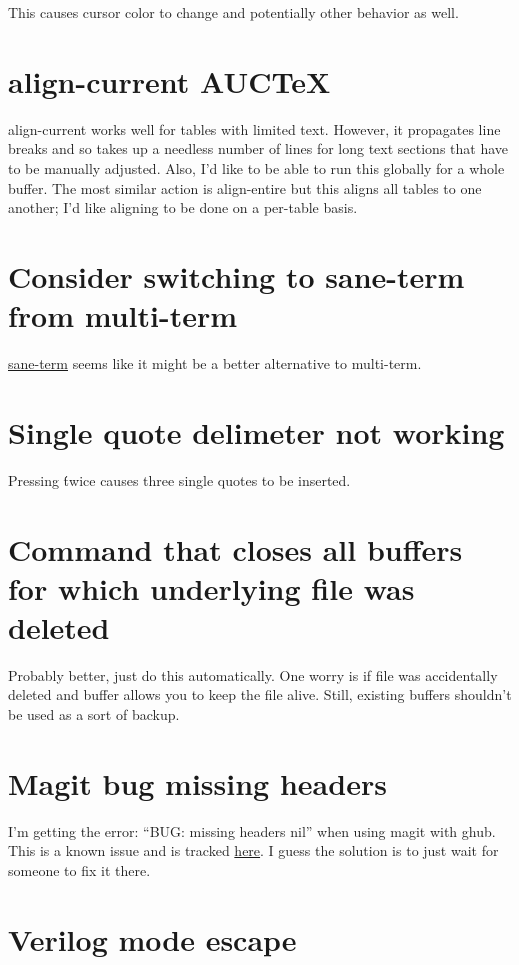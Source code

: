 \documentclass{default}
\begin{document}
This causes cursor color to change and potentially other behavior as well.

\section{align-current AUCTeX}

align-current works well for tables with limited text. However, it propagates line breaks and so
takes up a needless number of lines for long text sections that have to be manually adjusted. Also,
I'd like to be able to run this globally for a whole buffer. The most similar action is align-entire
but this aligns all tables to one another; I'd like aligning to be done on a per-table basis.

\section{Consider switching to sane-term from multi-term}

\href{https://github.com/adamrt/sane-term}{sane-term} seems like it might be a better alternative to multi-term.

\section{Single quote delimeter not working}

Pressing \' twice causes three single quotes to be inserted.

\section{Command that closes all buffers for which underlying file was deleted}

Probably better, just do this automatically. One worry is if file was accidentally deleted and
buffer allows you to keep the file alive. Still, existing buffers shouldn't be used as a sort of
backup.

\section{Magit bug missing headers}

I'm getting the error: ``BUG: missing headers nil'' when using magit with ghub. This is a known
issue and is tracked \href{https://github.com/magit/ghub/issues/81}{here}. I guess the solution is
to just wait for someone to fix it there.

\section{Verilog mode escape}
\end{document}

